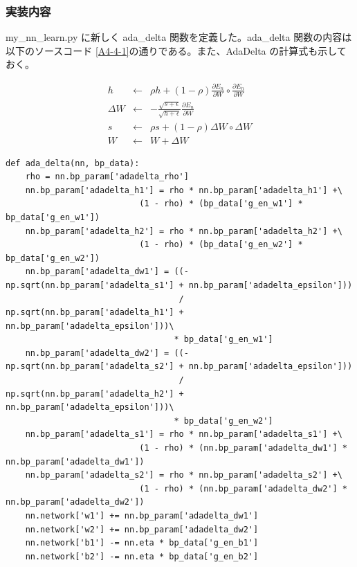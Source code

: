 \documentclass[a4paper,dvipdfmx]{jsarticle}
\begin{document}
\subsubsection*{実装内容}
my\_nn\_learn.py に新しく ada\_delta 関数を定義した。ada\_delta 関数の内容は以下のソースコード \ref{A4-4-1}の通りである。また、AdaDelta の計算式も示しておく。

\begin{eqnarray}
  \label{adadelta1}
 h & \leftarrow & \rho h + (1-\rho)\frac{\partial E_n}{\partial W} \circ \frac{\partial E_n}{\partial W} \\
 \label{adadelta2}
 \Delta W & \leftarrow & - \frac{\sqrt{s + \epsilon}}{\sqrt{h + \epsilon}} \frac{\partial E_n}{\partial W} \\
  \label{adadelta3}
 s & \leftarrow & \rho s + (1-\rho) \Delta W \circ \Delta W \\
 \label{adadelta4}
 W & \leftarrow & W + \Delta W
\end{eqnarray}

\begin{lstlisting}[caption="AdaDelta",label=A4-4-1]
def ada_delta(nn, bp_data):
    rho = nn.bp_param['adadelta_rho']
    nn.bp_param['adadelta_h1'] = rho * nn.bp_param['adadelta_h1'] +\
                           (1 - rho) * (bp_data['g_en_w1'] * bp_data['g_en_w1'])
    nn.bp_param['adadelta_h2'] = rho * nn.bp_param['adadelta_h2'] +\
                           (1 - rho) * (bp_data['g_en_w2'] * bp_data['g_en_w2'])
    nn.bp_param['adadelta_dw1'] = ((-np.sqrt(nn.bp_param['adadelta_s1'] + nn.bp_param['adadelta_epsilon']))
                                   / np.sqrt(nn.bp_param['adadelta_h1'] + nn.bp_param['adadelta_epsilon']))\
                                  * bp_data['g_en_w1']
    nn.bp_param['adadelta_dw2'] = ((-np.sqrt(nn.bp_param['adadelta_s2'] + nn.bp_param['adadelta_epsilon']))
                                   / np.sqrt(nn.bp_param['adadelta_h2'] + nn.bp_param['adadelta_epsilon']))\
                                  * bp_data['g_en_w2']
    nn.bp_param['adadelta_s1'] = rho * nn.bp_param['adadelta_s1'] +\
                           (1 - rho) * (nn.bp_param['adadelta_dw1'] * nn.bp_param['adadelta_dw1'])
    nn.bp_param['adadelta_s2'] = rho * nn.bp_param['adadelta_s2'] +\
                           (1 - rho) * (nn.bp_param['adadelta_dw2'] * nn.bp_param['adadelta_dw2'])
    nn.network['w1'] += nn.bp_param['adadelta_dw1']
    nn.network['w2'] += nn.bp_param['adadelta_dw2']
    nn.network['b1'] -= nn.eta * bp_data['g_en_b1']
    nn.network['b2'] -= nn.eta * bp_data['g_en_b2']
\end{lstlisting}
\end{document}
